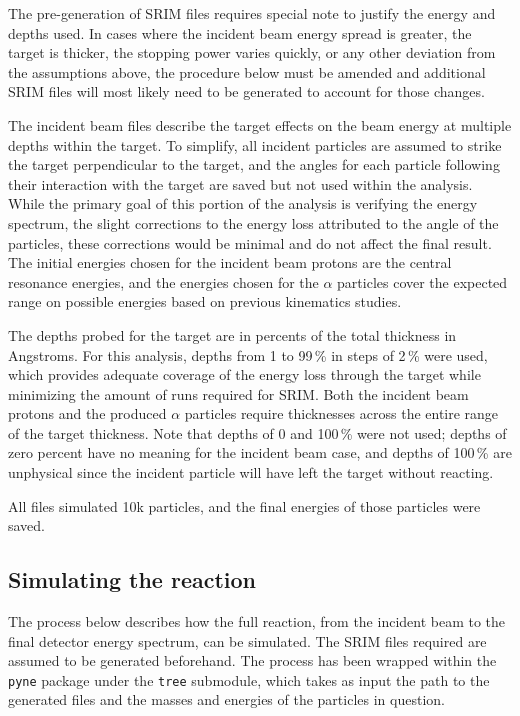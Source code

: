 The pre-generation of SRIM files requires special note to justify the
energy and depths used. In cases where the incident beam energy spread
is greater, the target is thicker, the stopping power varies quickly, or
any other deviation from the assumptions above, the procedure below must
be amended and additional SRIM files will most likely need to be
generated to account for those changes.

The incident beam files describe the target effects on the beam energy
at multiple depths within the target. To simplify, all incident
particles are assumed to strike the target perpendicular to the target,
and the angles for each particle following their interaction with the
target are saved but not used within the analysis. While the primary
goal of this portion of the analysis is verifying the energy spectrum,
the slight corrections to the energy loss attributed to the angle of the
particles, these corrections would be minimal and do not affect the
final result. The initial energies chosen for the incident beam protons
are the central resonance energies, and the energies chosen for the
$\alpha$ particles cover the expected range on possible energies based
on previous kinematics studies.

The depths probed for the target are in percents of the total thickness
in Angstroms. For this analysis, depths from 1 to 99\,\% in steps of 2\,\%
were used, which provides adequate coverage of the energy loss through
the target while minimizing the amount of runs required for SRIM. Both
the incident beam protons and the produced $\alpha$ particles require
thicknesses across the entire range of the target thickness. Note that
depths of 0 and 100\,\% were not used; depths of zero percent have no
meaning for the incident beam case, and depths of 100\,\% are unphysical
since the incident particle will have left the target without reacting.

All files simulated 10k particles, and the final energies of those
particles were saved.


\subsection{Simulating the reaction}\label{simulating-the-reaction}

The process below describes how the full reaction, from the incident
beam to the final detector energy spectrum, can be simulated. The SRIM
files required are assumed to be generated beforehand. The process has
been wrapped within the \verb+pyne+ package under the \verb+tree+
submodule, which takes as input the path to the generated files and the
masses and energies of the particles in question.

